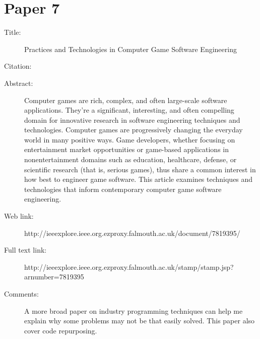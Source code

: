 \documentclass{scrartcl}
\begin{document}
\section*{Paper 7}
\begin{description}
\item[Title:] Practices and Technologies in Computer Game Software Engineering
\item[Citation:] \cite{ReuseScacchi}
\item[Abstract:] Computer games are rich, complex, and often large-scale software applications. They're a significant, interesting, and often compelling domain for innovative research in software engineering techniques and technologies. Computer games are progressively changing the everyday world in many positive ways. Game developers, whether focusing on entertainment market opportunities or game-based applications in nonentertainment domains such as education, healthcare, defense, or scientific research (that is, serious games), thus share a common interest in how best to engineer game software. This article examines techniques and technologies that inform contemporary computer game software engineering.
\item[Web link:] http://ieeexplore.ieee.org.ezproxy.falmouth.ac.uk/document/7819395/
\item[Full text link:] http://ieeexplore.ieee.org.ezproxy.falmouth.ac.uk/stamp/stamp.jsp?arnumber=7819395
\item[Comments:] 
A more broad paper on industry programming techniques can help me explain why some problems may not be that easily solved. 
This paper also cover code repurposing.
\end{description}
\end{document}
